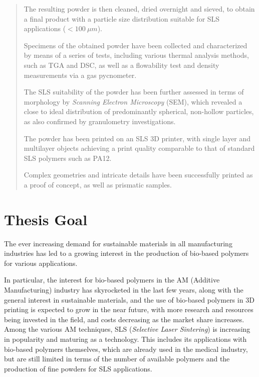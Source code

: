 \documentclass{article}
\begin{document}
\begin{abstract}
        The resulting powder is then cleaned, dried overnight and sieved, to obtain a final product with a particle size distribution suitable for SLS applications ($ < 100 \ \mu m $).


        Specimens of the obtained powder have been collected and characterized by means of a series of tests, including various thermal analysis methods, such as TGA and DSC, as well as a flowability test and density measurements via a gas pycnometer.

        The SLS suitability of the powder has been further assessed in terms of morphology by \textit{Scanning Electron Microscopy} (SEM), which revealed a close to ideal distribution of predominantly spherical, non-hollow particles, 
        as also confirmed by granulometry investigations. 

        The powder has been printed on an SLS 3D printer, with single layer and multilayer objects achieving a print quality comparable to that of standard SLS polymers such as PA12.

        Complex geometries and intricate details have been successfully printed as a proof of concept, as well as prismatic samples. 
                     


    \end{abstract}
    \newpage
    \tableofcontents
    \newpage 
    \listoffigures
    \listoftables
    \newpage
    \printglossaries

    \newpage

    \section{Thesis Goal\label{Thesis_Goal}}

    The ever increasing demand for sustainable materials in all manufacturing industries has led to a growing interest in the 
    production of bio-based polymers for various applications. 

    In particular, the interest for bio-based polymers in the AM (Additive Manufacturing) industry has skyrocketed in the last few years, 
    along with the general interest in sustainable materials, and the use of bio-based polymers in 3D printing is expected to grow in the near future, 
    with more research and resources being invested in the field, and costs decreasing as the market share increases. \\  

    Among the various AM techniques, SLS (\textit{Selective Laser Sintering}) is increasing in popularity and 
    maturing as a technology. This includes its applications with bio-based polymers themselves, which are already used in the medical industry, 
    but are still limited in terms of the number of available polymers and the production of fine powders for SLS applications. \\ 
\end{document}
